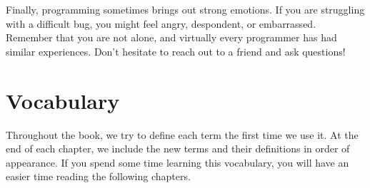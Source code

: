 
Finally, programming sometimes brings out strong emotions.
If you are struggling with a difficult bug, you might feel angry, despondent, or embarrassed.
Remember that you are not alone, and virtually every programmer has had similar experiences.
Don't hesitate to reach out to a friend and ask questions!


\section{Vocabulary}

Throughout the book, we try to define each term the first time we use it.
At the end of each chapter, we include the new terms and their definitions in order of appearance.
If you spend some time learning this vocabulary, you will have an easier time reading the following chapters.

